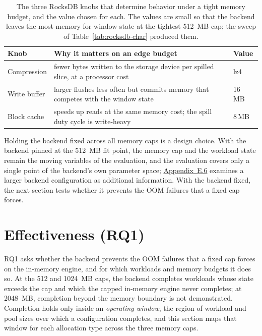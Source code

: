 \begin{table}[ht]
\centering
\small
\begin{tabular}{|l|p{8.2cm}|l|}
\hline
\textbf{Knob} & \textbf{Why it matters on an edge budget} & \textbf{Value} \\
\hline
Compression & fewer bytes written to the storage device per spilled slice, at a processor cost~\cite{rocksdb-compression} & lz4 \\
\hline
Write buffer & larger flushes less often but commits memory that competes with the window state~\cite{rocksdb-memory} & 16\, MB \\
\hline
Block cache & speeds up reads at the same memory cost; the spill duty cycle is write-heavy~\cite{rocksdb-memory} & 8\,MB \\
\hline
\end{tabular}
\caption[Chosen RocksDB configuration and its knobs]{The three RocksDB knobs that determine behavior under a tight memory
budget, and the value chosen for each. The values are small so that the backend
leaves the most memory for window state at the tightest 512\, MB cap; the sweep
of Table~\ref{tab:rocksdb-char} produced them.}
\label{tab:rocksdb-config}
\end{table}

Holding the backend fixed across all memory caps is a design choice.
With the backend pinned at the 512\, MB fit point, the memory cap and the workload state remain the moving variables of the evaluation, and the evaluation covers only a single point of the backend's own parameter space; \hyperref[app:rb32]{Appendix~E.6} examines a larger backend configuration as additional information.
With the backend fixed, the next section tests whether it prevents the OOM failures that a fixed cap forces.

\section{Effectiveness (RQ1)\label{sec:rq1}}

RQ1 asks whether the backend prevents the OOM failures that a fixed cap forces on the in-memory engine, and for which workloads and memory budgets it does so.
At the 512 and 1024\, MB caps, the backend completes workloads whose state exceeds the cap and which the capped in-memory engine never completes; at 2048\, MB, completion beyond the memory boundary is not demonstrated.
Completion holds only inside an \emph{operating window}, the region of workload and pool sizes over which a configuration completes, and this section maps that window for each allocation type across the three memory caps.


